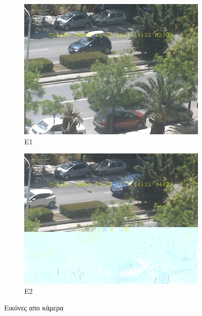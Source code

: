 \documentclass{article}
\begin{document}
\begin{figure}[H]
\begin{subfigure}{.5\textwidth}
  \centering
  \includegraphics[width=0.9\linewidth]{image_M2303.jpg}
  \caption{E1}
  \label{fig:sfig1}
\end{subfigure}%
\begin{subfigure}{.5\textwidth}
  \centering
  \includegraphics[width=0.9\linewidth]{image_G4482.jpg}
  \caption{E2}
  \label{fig:sfig2}
\end{subfigure}
\caption{Εικόνες απο κάμερα}
\label{fig:fig}
\end{figure}
\end{document}
